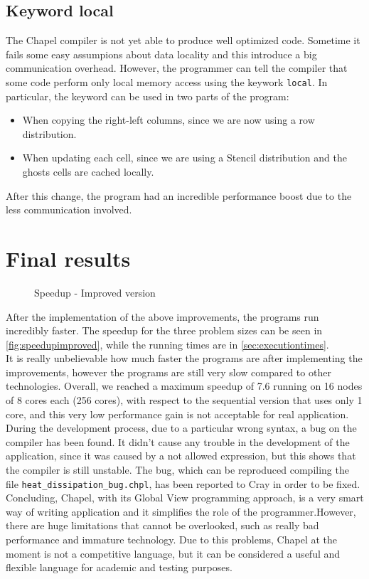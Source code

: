 \documentclass{article}
\begin{document}
\subsection{Keyword local}
The Chapel compiler is not yet able to produce well optimized code. Sometime it fails some easy assumpions about data locality and this introduce a big communication overhead. However, the programmer can tell the compiler that some code perform only local memory access using the keywork \texttt{local}. In particular, the keyword can be used in two parts of the program:
\begin{itemize}
    \item When copying the right-left columns, since we are now using a row distribution.
    \item When updating each cell, since we are using a Stencil distribution and the ghosts cells are cached locally.
\end{itemize}
After this change, the program had an incredible performance boost due to the less communication involved.


\section{Final results}
\begin{figure}
\centering
{}
\caption{Speedup - Improved version}
\label{fig:speedupimproved}
\end{figure}

After the implementation of the above improvements, the programs run incredibly faster. The speedup for the three problem sizes can be seen in \autoref{fig:speedupimproved}, while the running times are in \autoref{sec:executiontimes}. \\
It is really unbelievable how much faster the programs are after implementing the improvements, however the programs are still very slow compared to other technologies. Overall, we reached a maximum speedup of 7.6 running on 16 nodes of 8 cores each (256 cores), with respect to the sequential version that uses only 1 core, and this very low performance gain is not acceptable for real application. \\
During the development process, due to a particular wrong syntax, a bug on the compiler has been found. It didn't cause any trouble in the development of the application, since it was caused by a not allowed expression, but this shows that the compiler is still unstable. The bug, which can be reproduced compiling the file \texttt{heat\_dissipation\_bug.chpl}, has been reported to Cray in order to be fixed. \\
Concluding, Chapel, with its Global View programming approach, is a very smart way of writing application and it simplifies the role of the programmer.However, there are huge limitations that cannot be overlooked, such as really bad performance and immature technology. Due to this problems, Chapel at the moment is not a competitive language, but it can be considered a useful and flexible language for academic and testing purposes.
\end{document}

